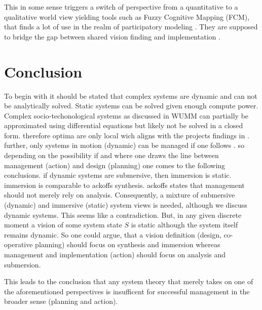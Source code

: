 \documentclass[a4paper,11pt]{article}
\begin{document}
This in some sense triggers a switch of perspective from a quantitative to a
qualitative world view yielding tools such as Fuzzy Cognitive Mapping (FCM),
that finds a lot of use in the realm of participatory modeling
\cite{kosko1986fuzzy}. They are supposed to bridge the gap between shared
vision finding and implementation \cite{aguilar2005survey}.

\section{Conclusion}

To begin with it should be stated that complex systems are dynamic and can not
be analytically solved. Static systems can be solved given enough compute
power. Complex socio-techonological systems as discussed in WUMM can partially
be approximated using differential equations but likely not be solved in a
closed form. therefore optima are only local wich aligns with the projects
findings in \cite[p.~79]{grabe2020seminar}. further, only systems in motion
(dynamic) can be managed if one follows \cite{shchedrovitsky1981principles}.
so depending on the possibility if and where one draws the line between
management (action) and design (planning) one comes to the following
conclusions. if dynamic systems are submersive, then immersion is static.
immersion is comparable to ackoffs synthesis. ackoffs states that management
should not merely rely on analysis. Consequently, a mixture of submersive
(dynamic) and immersive (static) system views is needed, although we discuss
dynamic systems. This seems like a contradiction. But, in any given discrete
moment a vision of some system state $S$ is static although the system itself
remains dynamic. So one could argue, that a vision definition (design,
co-operative planning) should focus on synthesis and immersion whereas
management and implementation (action) should focus on analysis and
submersion.

This leads to the conclusion that any system theory that merely takes on one
of the aforementioned perspectives is insufficent for successful management in
the broader sense (planning and action).

\newpage
\end{document}
